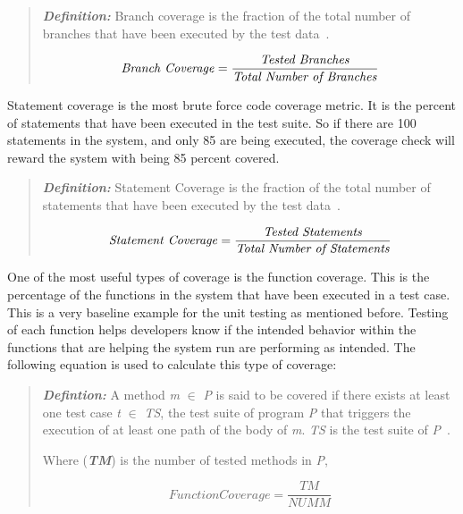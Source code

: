         \begin{quote}
        \textbf{\textit{Definition:}} Branch coverage is the fraction of the total number of branches that have been executed by the test data~\cite{malaiya2002software}.

        \begin{equation}
        \mbox{\emph{Branch Coverage}} = \frac{\mbox{\emph{Tested Branches}}}{\mbox{\emph{Total Number of Branches}}}
        \end{equation}
        \end{quote}

Statement coverage is the most brute force code coverage metric. It is the  percent of statements that have been executed in the test suite. So if there are 100 statements in the system, and only 85 are being executed, the coverage check will reward the system with being 85 percent covered.

\begin{quote}
\textbf{\textit{Definition:}} Statement Coverage is the fraction of the total number of statements that have been executed by the test data~\cite{malaiya2002software}.

\begin{equation}
\mbox{\emph{Statement Coverage}} = \frac{\mbox{\emph{Tested Statements}}}{\mbox{\emph{Total Number of Statements}}}
\end{equation}
\end{quote}
One of the most useful types of coverage is the function coverage. This is the percentage of the functions in the system that have been executed in a test case. This is a very baseline example for the unit testing as mentioned before. Testing of each function helps developers know if the intended behavior within the functions that are helping the system run are performing as intended. The following equation is used to calculate this type of coverage:

        \begin{quote}
        \textbf{\textit{Defintion:}} A method \textit{m} $\in$ \textit{P} is said to be covered if there exists at least
        one test case \textit{t} $\in$ \textit{TS}, the test suite of program \textit{P} that triggers the execution of at least one path of the
        body of \textit{m}. \textit{TS} is the test suite of \textit{P}~\cite{vera2017comprehensive}.

        Where (\textbf{\textit{TM}}) is the number of tested methods in \textit{P},

        \begin{equation}
        Function Coverage = \frac{TM}{NUMM}
        \end{equation}
        \end{quote}

